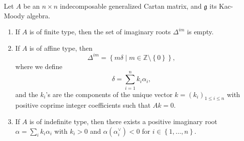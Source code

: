 \documentclass[11pt, letterpaper]{article}
\theoremstyle{plain}
\begin{document}
\begin{theorem}\label{thm:5-5}
	Let $A$ be an $n\times n$ indecomposable generalized Cartan matrix, and $\mathfrak{g} $ its Kac-Moody algebra.
	\begin{enumerate}[align=left, label=(\arabic*)]
		\item If $A$ is of finite type, then the set of imaginary roots $\Delta ^{im} $ is empty.
		\item If $A$ is of affine type, then
			\[
				\Delta ^{im} =\left\{ m\delta \mid m\in\mathbb{Z} \setminus \left\{ 0 \right\}  \right\} ,
			\]
			where we define
			\[
				\delta  = \sum_{i=1}^{n} k_i \alpha _i,
			\]
	and the $k_i$'s are the components of the unique vector $k=(k_i)_{1\leq i\leq n}$ with positive coprime integer coefficients such that $Ak=0$.
		\item If $A$ is of indefinite type, then there exists a positive imaginary root $\alpha =\sum_{i} k_i\alpha _i$ with $k_i>0$ and $\alpha (\alpha _i^\vee )<0$ for $i\in \left\{ 1, \ldots ,n \right\} $.
	\end{enumerate}
\end{theorem}
\end{document}

